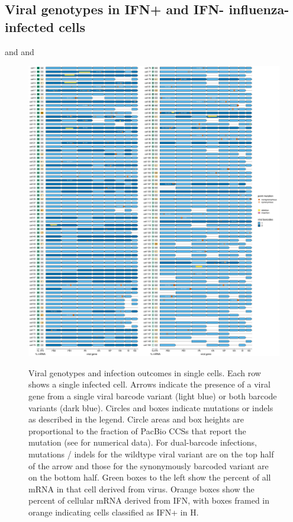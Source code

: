 \documentclass[9pt,lineno]{elife}
\begin{document}
\subsection{Viral genotypes in IFN+ and IFN- influenza-infected cells}
 and  and 


\begin{figure}
\begin{fullwidth}
{\centering
\includegraphics[height=0.8\textheight]{figures/single_cell_figures/p_genotypes.pdf}
}
\caption{
Viral genotypes and infection outcomes in single cells.
Each row shows a single infected cell.
Arrows indicate the presence of a viral gene from a single viral barcode variant (light blue) or both barcode variants (dark blue).
Circles and boxes indicate mutations or indels as described in the legend.
Circle areas and box heights are proportional to the fraction of PacBio CCSs that report the mutation (see  for numerical data).
For dual-barcode infections, mutations / indels for the wildtype viral variant are on the top half of the arrow and those for the synonymously barcoded variant are on the bottom half. 
Green boxes to the left show the percent of all mRNA in that cell derived from virus.
Orange boxes show the percent of cellular mRNA derived from IFN, with boxes framed in orange indicating cells classified as IFN+ in H.
}
\label{fig:genotypes}


\end{fullwidth}
\end{figure}
\end{document}

